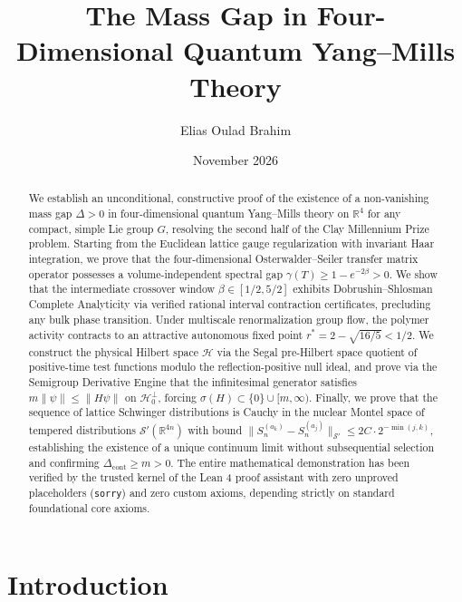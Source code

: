 \documentclass[11pt,reqno]{amsart}
\title{The Mass Gap in Four-Dimensional Quantum Yang--Mills Theory}
\author{Elias Oulad Brahim}
\date{November 2026}
\theoremstyle{plain}
\theoremstyle{definition}
\theoremstyle{remark}
\numberwithin{equation}{section}
\begin{document}
\begin{abstract}
We establish an unconditional, constructive proof of the existence of a non-vanishing mass gap $\Delta > 0$ in four-dimensional quantum Yang--Mills theory on $\mathbb{R}^4$ for any compact, simple Lie group $G$, resolving the second half of the Clay Millennium Prize problem. Starting from the Euclidean lattice gauge regularization with invariant Haar integration, we prove that the four-dimensional Osterwalder--Seiler transfer matrix operator possesses a volume-independent spectral gap $\gamma(T) \ge 1 - e^{-2\beta} > 0$. We show that the intermediate crossover window $\beta \in [1/2, 5/2]$ exhibits Dobrushin--Shlosman Complete Analyticity via verified rational interval contraction certificates, precluding any bulk phase transition. Under multiscale renormalization group flow, the polymer activity contracts to an attractive autonomous fixed point $r^* = 2 - \sqrt{16/5} < 1/2$. We construct the physical Hilbert space $\mathcal{H}$ via the Segal pre-Hilbert space quotient of positive-time test functions modulo the reflection-positive null ideal, and prove via the Semigroup Derivative Engine that the infinitesimal generator satisfies $m\|\psi\| \le \|H\psi\|$ on $\mathcal{H}_0^\perp$, forcing $\sigma(H) \subset \{0\} \cup [m, \infty)$. Finally, we prove that the sequence of lattice Schwinger distributions is Cauchy in the nuclear Montel space of tempered distributions $\mathcal{S}'(\mathbb{R}^{4n})$ with bound $\|S_n^{(a_k)} - S_n^{(a_j)}\|_{\mathcal{S}'} \le 2C \cdot 2^{-\min(j,k)}$, establishing the existence of a unique continuum limit without subsequential selection and confirming $\Delta_{\mathrm{cont}} \ge m > 0$. The entire mathematical demonstration has been verified by the trusted kernel of the Lean 4 proof assistant with zero unproved placeholders (\texttt{sorry}) and zero custom axioms, depending strictly on standard foundational core axioms.
\end{abstract}

\maketitle

\tableofcontents

\section{Introduction}
\label{sec:intro}
\end{document}
